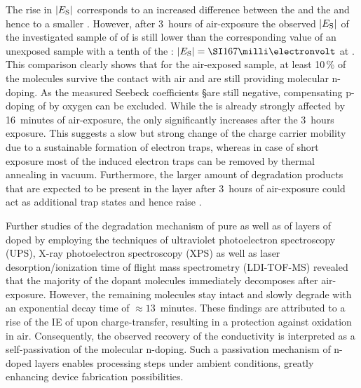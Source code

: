 The rise in $|\Es|$ corresponds to an increased difference between the \EfLongL and the \EtLongL and hence to a smaller \neLongL. However, after 3~hours of air-exposure the observed $|\Es|$ of the investigated sample of \C[0.033] of \WPd is still lower than the corresponding value of an unexposed sample with a tenth of the \CLong: \mbox{$|\Es|=\meV{167}$} at \C[0.004]. This comparison clearly shows that for the air-exposed sample, at least 10\,\% of the \WPd molecules survive the contact with air and are still providing molecular n-doping. As the measured Seebeck coefficients \S are still negative, compensating p-doping of \CS by oxygen can be excluded.
While the \Es is already strongly affected by 16~minutes of air-exposure, the \Eact only significantly increases after the 3~hours exposure. This suggests a slow but strong change of the charge carrier mobility due to a sustainable formation of electron traps, whereas in case of short exposure most of the induced electron traps can be removed by thermal annealing in vacuum. Furthermore, the larger amount of degradation products that are expected to be present in the layer after 3~hours of air-exposure could act as additional trap states and hence raise \Eact.

Further studies of the degradation mechanism of pure \WPd as well as of layers of \CS doped by \WPd employing the techniques of ultraviolet photoelectron spectroscopy (UPS), X-ray photoelectron spectroscopy (XPS) as well as laser desorption/ionization time of flight mass spectrometry (LDI-TOF-MS) revealed that the majority of the dopant molecules immediately decomposes after air-exposure\cite{TietzeMenke2013}.
However, the remaining \WPd molecules stay intact and slowly degrade with an exponential decay time of \mbox{$\approx13$~minutes}. These findings are attributed to a rise of the IE of \WPd upon charge-transfer, resulting in a protection against oxidation in air.
Consequently, the observed recovery of the conductivity is interpreted as a self-passivation of the molecular n-doping.
Such a passivation mechanism of n-doped layers enables processing steps under ambient conditions, greatly enhancing device fabrication possibilities\cite{Kleemann2012}.

